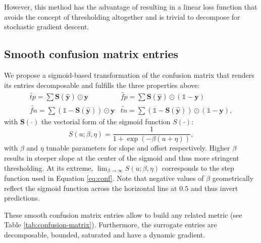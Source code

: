 However, this method has the advantage of resulting in a linear loss function that avoids the concept of thresholding altogether and is trivial to decompose for stochastic gradient descent.

\subsection{Smooth confusion matrix entries}

We propose a sigmoid-based transformation of the confusion matrix that renders its entries decomposable and fulfills the three properties above:
%
\begin{equation}
\label{eq:smooth}
\begin{array}{ll} \widetilde{\mathit{tp}} = \sum \mathbf{S}(\hat{\mathbf{y}}) \odot \mathbf{y}  & \widetilde{\mathit{fp}} = \sum \mathbf{S}(\hat{\mathbf{y}}) \odot (\mathds{1} - \mathbf{y}) \\[.5em] \widetilde{\mathit{fn}} = \sum (\mathds{1} - \mathbf{S}(\hat{\mathbf{y}})) \odot \mathbf{y} & \widetilde{\mathit{tn}} = \sum (\mathds{1} - \mathbf{S}(\hat{\mathbf{y}})) \odot (\mathds{1} - \mathbf{y}),
\end{array}
\end{equation}
%
with $\mathbf{S}(\cdot)$ the vectorial form of the sigmoid function $S(\cdot)$:
%
\begin{equation}
S(u; \beta, \eta)=\frac{1}{1+\exp (-\beta (u + \eta))},
\end{equation}
%
with \(\beta\) and \(\eta\) tunable parameters for slope and offset respectively. Higher \(\beta\) results in steeper slope at the center of the sigmoid and thus more stringent thresholding. At its extreme, \(\lim_{\beta\to\infty} S(u; \beta, \eta)\) corresponds to the step function used in Equation \ref{eq:conf}. Note that negative values of $\beta$ geometrically reflect the sigmoid function across the horizontal line at $0.5$ and thus invert predictions.


These smooth confusion matrix entries allow to build any related metric (see Table \ref{tab:confusion-matrix}). Furthermore, the surrogate entries are decomposable, bounded, saturated and have a dynamic gradient.

